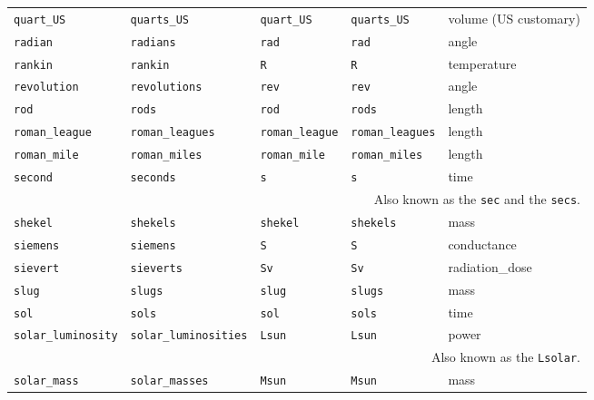 \begin{landscape}
\begin{center}
\begin{longtable}{|lllll|}
{\tt\footnotesize quart\_US} & {\tt\footnotesize quarts\_US} & {\tt\footnotesize quart\_US} & {\tt\footnotesize quarts\_US} & volume (US customary) \\
{\tt\footnotesize radian} & {\tt\footnotesize radians} & {\tt\footnotesize rad} & {\tt\footnotesize rad} & angle \\
{\tt\footnotesize rankin} & {\tt\footnotesize rankin} & {\tt\footnotesize R} & {\tt\footnotesize R} & temperature \\
{\tt\footnotesize revolution} & {\tt\footnotesize revolutions} & {\tt\footnotesize rev} & {\tt\footnotesize rev} & angle \\
{\tt\footnotesize rod} & {\tt\footnotesize rods} & {\tt\footnotesize rod} & {\tt\footnotesize rods} & length \\
{\tt\footnotesize roman\_league} & {\tt\footnotesize roman\_leagues} & {\tt\footnotesize roman\_league} & {\tt\footnotesize roman\_leagues} & length \\
{\tt\footnotesize roman\_mile} & {\tt\footnotesize roman\_miles} & {\tt\footnotesize roman\_mile} & {\tt\footnotesize roman\_miles} & length \\
{\tt\footnotesize second} & {\tt\footnotesize seconds} & {\tt\footnotesize s} & {\tt\footnotesize s} & time \\
\multicolumn{5}{|r|}{\footnotesize Also known as the {\tt sec} and the {\tt secs}.} \\
{\tt\footnotesize shekel} & {\tt\footnotesize shekels} & {\tt\footnotesize shekel} & {\tt\footnotesize shekels} & mass \\
{\tt\footnotesize siemens} & {\tt\footnotesize siemens} & {\tt\footnotesize S} & {\tt\footnotesize S} & conductance \\
{\tt\footnotesize sievert} & {\tt\footnotesize sieverts} & {\tt\footnotesize Sv} & {\tt\footnotesize Sv} & radiation\_dose \\
{\tt\footnotesize slug} & {\tt\footnotesize slugs} & {\tt\footnotesize slug} & {\tt\footnotesize slugs} & mass \\
{\tt\footnotesize sol} & {\tt\footnotesize sols} & {\tt\footnotesize sol} & {\tt\footnotesize sols} & time \\
{\tt\footnotesize solar\_luminosity} & {\tt\footnotesize solar\_luminosities} & {\tt\footnotesize Lsun} & {\tt\footnotesize Lsun} & power \\
\multicolumn{5}{|r|}{\footnotesize Also known as the {\tt Lsolar}.} \\
{\tt\footnotesize solar\_mass} & {\tt\footnotesize solar\_masses} & {\tt\footnotesize Msun} & {\tt\footnotesize Msun} & mass \\

\end{longtable}
\end{center}
\end{landscape}
